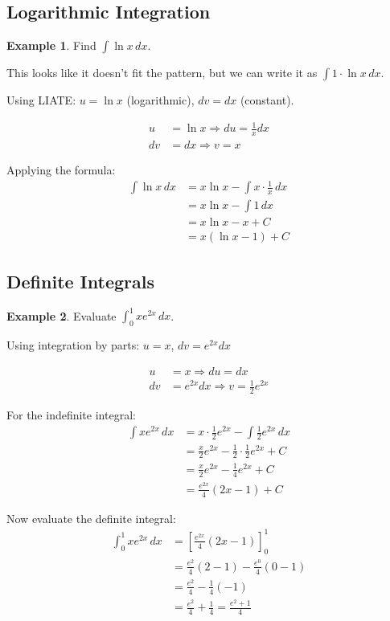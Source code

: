 \documentclass[12pt,a4paper]{book}
\theoremstyle{definition}
\newtheorem{example}{Example}[chapter]
\begin{document}
\subsection{Logarithmic Integration}

\begin{example}
Find $\int \ln x \, dx$.

This looks like it doesn't fit the pattern, but we can write it as $\int 1 \cdot \ln x \, dx$.

Using LIATE: $u = \ln x$ (logarithmic), $dv = dx$ (constant).

\begin{align}
u &= \ln x \Rightarrow du = \frac{1}{x} dx\\
dv &= dx \Rightarrow v = x
\end{align}

Applying the formula:
\begin{align}
\int \ln x \, dx &= x \ln x - \int x \cdot \frac{1}{x} \, dx\\
&= x \ln x - \int 1 \, dx\\
&= x \ln x - x + C\\
&= x(\ln x - 1) + C
\end{align}
\end{example}

\subsection{Definite Integrals}

\begin{example}
Evaluate $\int_0^1 xe^{2x} \, dx$.

Using integration by parts: $u = x$, $dv = e^{2x} dx$

\begin{align}
u &= x \Rightarrow du = dx\\
dv &= e^{2x} dx \Rightarrow v = \frac{1}{2}e^{2x}
\end{align}

For the indefinite integral:
\begin{align}
\int xe^{2x} \, dx &= x \cdot \frac{1}{2}e^{2x} - \int \frac{1}{2}e^{2x} \, dx\\
&= \frac{x}{2}e^{2x} - \frac{1}{2} \cdot \frac{1}{2}e^{2x} + C\\
&= \frac{x}{2}e^{2x} - \frac{1}{4}e^{2x} + C\\
&= \frac{e^{2x}}{4}(2x - 1) + C
\end{align}

Now evaluate the definite integral:
\begin{align}
\int_0^1 xe^{2x} \, dx &= \left[\frac{e^{2x}}{4}(2x - 1)\right]_0^1\\
&= \frac{e^2}{4}(2 - 1) - \frac{e^0}{4}(0 - 1)\\
&= \frac{e^2}{4} - \frac{1}{4}(-1)\\
&= \frac{e^2}{4} + \frac{1}{4} = \frac{e^2 + 1}{4}
\end{align}
\end{example}
\end{document}
